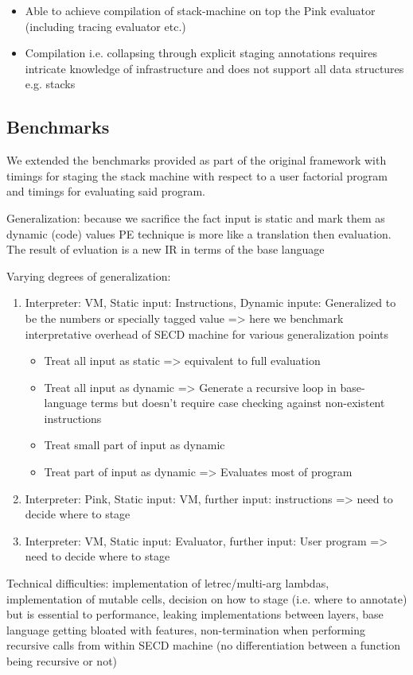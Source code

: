 \documentclass{article}
\theoremstyle{definition}
\begin{document}
\begin{itemize}
	\item Able to achieve compilation of stack-machine on top the Pink evaluator (including tracing evaluator etc.)
	\item Compilation i.e. collapsing through explicit staging annotations requires intricate knowledge of infrastructure and does not support all data structures e.g. stacks
\end{itemize}

\subsection{Benchmarks}
We extended the benchmarks provided as part of the original framework \cite{amin2017collapsing} with timings for staging the stack machine with respect to a user factorial program and timings for evaluating said program.

Generalization: because we sacrifice the fact input is static and mark them as dynamic (code) values
PE technique is more like a translation then evaluation. The result of evluation is a new IR in terms of the base language

Varying degrees of generalization:
\begin{enumerate}
	\item Interpreter: VM, Static input: Instructions, Dynamic inpute: Generalized to be the numbers or specially tagged value => here we benchmark interpretative overhead of SECD machine for various generalization points
	\begin{itemize}
		\item Treat all input as static => equivalent to full evaluation
		\item Treat all input as dynamic => Generate a recursive loop in base-language terms but doesn't require case checking against non-existent instructions
		\item Treat small part of input as dynamic
		\item Treat part of input as dynamic => Evaluates most of program
	\end{itemize}
	\item Interpreter: Pink, Static input: VM, further input: instructions => need to decide where to stage
	\item Interpreter: VM, Static input: Evaluator, further input: User program => need to decide where to stage
\end{enumerate}

Technical difficulties: implementation of letrec/multi-arg lambdas, implementation of mutable cells, decision on how to stage (i.e. where to annotate) but is essential to performance, leaking implementations between layers, base language getting bloated with features, non-termination when performing recursive calls from within SECD machine (no differentiation between a function being recursive or not)
\end{document}

